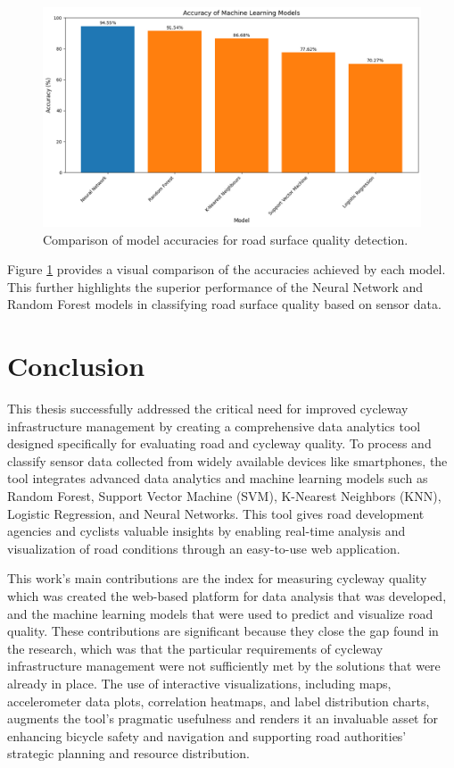 \documentclass[a4paper,12pt]{Classes/RoboticsLaTeX}
\begin{document}
\begin{abstracts}
\begin{figure}[h]
\centering
\includegraphics[width=\linewidth]{Figures/output.png}
\caption{Comparison of model accuracies for road surface quality detection.}
\label{fig:results}
\end{figure}

Figure \ref{fig:results} provides a visual comparison of the accuracies achieved by each model. This further highlights the superior performance of the Neural Network and Random Forest models in classifying road surface quality based on sensor data.
	\chapter{Conclusion}
	\label{chap:conclusion}
	
	This thesis successfully addressed the critical need for improved cycleway infrastructure management by creating a comprehensive data analytics tool designed specifically for evaluating road and cycleway quality. To process and classify sensor data collected from widely available devices like smartphones, the tool integrates advanced data analytics and machine learning models such as Random Forest, Support Vector Machine (SVM), K-Nearest Neighbors (KNN), Logistic Regression, and Neural Networks. This tool gives road development agencies and cyclists valuable insights by enabling real-time analysis and visualization of road conditions through an easy-to-use web application.

This work's main contributions are the index for measuring cycleway quality which was created the web-based platform for data analysis that was developed, and the machine learning models that were used to predict and visualize road quality. These contributions are significant because they close the gap found in the research, which was that the particular requirements of cycleway infrastructure management were not sufficiently met by the solutions that were already in place. The use of interactive visualizations, including maps, accelerometer data plots, correlation heatmaps, and label distribution charts, augments the tool's pragmatic usefulness and renders it an invaluable asset for enhancing bicycle safety and navigation and supporting road authorities' strategic planning and resource distribution.


\end{abstracts}
\end{document}
